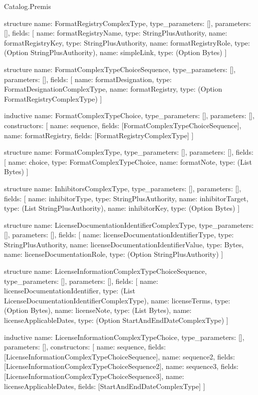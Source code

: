 \begin{lexlean}{Catalog.Premis}
\begin{semanticmodule}
structure{
  name: FormatRegistryComplexType,
  type_parameters: [],
  parameters: [],
  fields: [
    {name: formatRegistryName, type: StringPlusAuthority},
    {name: formatRegistryKey, type: StringPlusAuthority},
    {name: formatRegistryRole, type: (Option StringPlusAuthority)},
    {name: simpleLink, type: (Option Bytes)}
  ]
}

structure{
  name: FormatComplexTypeChoiceSequence,
  type_parameters: [],
  parameters: [],
  fields: [
    {name: formatDesignation, type: FormatDesignationComplexType},
    {name: formatRegistry, type: (Option FormatRegistryComplexType)}
  ]
}

inductive{
  name: FormatComplexTypeChoice,
  type_parameters: [],
  parameters: [],
  constructors: [
    {name: sequence, fields: [FormatComplexTypeChoiceSequence]},
    {name: formatRegistry, fields: [FormatRegistryComplexType]}
  ]
}

structure{
  name: FormatComplexType,
  type_parameters: [],
  parameters: [],
  fields: [
    {name: choice, type: FormatComplexTypeChoice},
    {name: formatNote, type: (List Bytes)}
  ]
}

structure{
  name: InhibitorsComplexType,
  type_parameters: [],
  parameters: [],
  fields: [
    {name: inhibitorType, type: StringPlusAuthority},
    {name: inhibitorTarget, type: (List StringPlusAuthority)},
    {name: inhibitorKey, type: (Option Bytes)}
  ]
}

structure{
  name: LicenseDocumentationIdentifierComplexType,
  type_parameters: [],
  parameters: [],
  fields: [
    {name: licenseDocumentationIdentifierType, type: StringPlusAuthority},
    {name: licenseDocumentationIdentifierValue, type: Bytes},
    {name: licenseDocumentationRole, type: (Option StringPlusAuthority)}
  ]
}

structure{
  name: LicenseInformationComplexTypeChoiceSequence,
  type_parameters: [],
  parameters: [],
  fields: [
    {name: licenseDocumentationIdentifier, type: (List LicenseDocumentationIdentifierComplexType)},
    {name: licenseTerms, type: (Option Bytes)},
    {name: licenseNote, type: (List Bytes)},
    {name: licenseApplicableDates, type: (Option StartAndEndDateComplexType)}
  ]
}

inductive{
  name: LicenseInformationComplexTypeChoice,
  type_parameters: [],
  parameters: [],
  constructors: [
    {name: sequence, fields: [LicenseInformationComplexTypeChoiceSequence]},
    {name: sequence2, fields: [LicenseInformationComplexTypeChoiceSequence2]},
    {name: sequence3, fields: [LicenseInformationComplexTypeChoiceSequence3]},
    {name: licenseApplicableDates, fields: [StartAndEndDateComplexType]}
  ]
}


\end{semanticmodule}
\end{lexlean}
